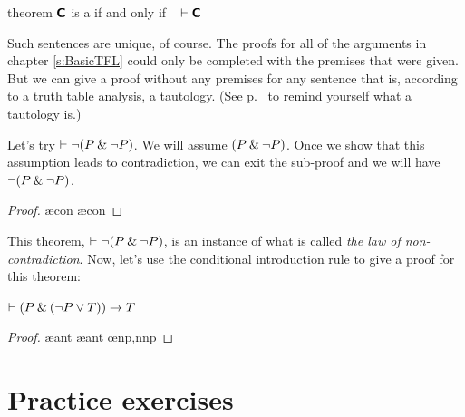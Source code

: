 {{{{{{{{{\begin{factboxy}{theorem}\label{def:syntactic_tautology_in_sl}
$\bm{\mathsf{C}}$ is a  if and only if ~ $\vdash \bm{\mathsf{C}}$
\end{factboxy}

\noindent Such sentences are unique, of course. The proofs for all of the arguments in chapter \ref{s:BasicTFL} could only be completed with the premises that were given. But we can give a proof without any premises for any sentence that is, according to a truth table analysis, a tautology. (See p.~\pageref{tautology-def} to remind yourself what a tautology is.) 

Let's try $\vdash {\neg} (P \mathbin{\&} {\neg} P)$. We will assume $(P \mathbin{\&} {\neg} P)$. Once we show that this assumption leads to contradiction, we can exit the sub-proof and we will have ${\neg} (P \mathbin{\&} {\neg} P)$.
	\begin{proof}
		\open
			 \as{}
			\ae{con}
			\ae{con}
		\close
	\end{proof}
This theorem, $\vdash {\neg} (P \mathbin{\&} {\neg} P)$, is an instance of what is called \emph{the law of non-contradiction}.
Now, let's use the conditional introduction rule to give a proof for this theorem:

\centerline{$\vdash (P \mathbin{\&} ({\neg} P \vee T)) \rightarrow T$}

	\begin{proof}
		\open
			 \as{}
			\ae{ant}
			\ae{ant}
			\oe{np,nnp}
		\close
	\end{proof}




\section{Practice exercises}

}}}}}}}}}
